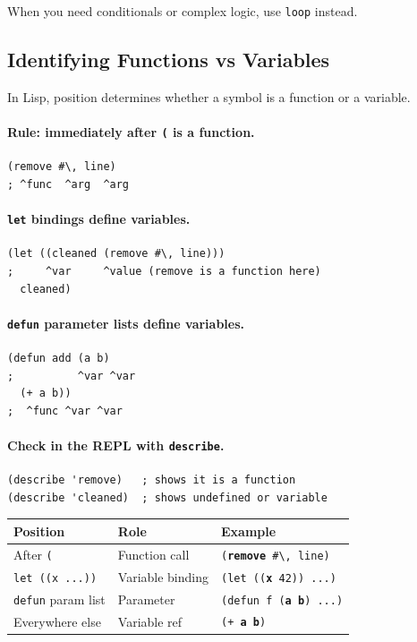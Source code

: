 When you need conditionals or complex logic, use \texttt{loop} instead.

\subsection{Identifying Functions vs Variables}

In Lisp, position determines whether a symbol is a function or a variable.

\paragraph{Rule: immediately after \texttt{(} is a function.}

\begin{lstlisting}
(remove #\, line)
; ^func  ^arg  ^arg
\end{lstlisting}

\paragraph{\texttt{let} bindings define variables.}

\begin{lstlisting}
(let ((cleaned (remove #\, line)))
;     ^var     ^value (remove is a function here)
  cleaned)
\end{lstlisting}

\paragraph{\texttt{defun} parameter lists define variables.}

\begin{lstlisting}
(defun add (a b)
;          ^var ^var
  (+ a b))
;  ^func ^var ^var
\end{lstlisting}

\paragraph{Check in the REPL with \texttt{describe}.}

\begin{lstlisting}
(describe 'remove)   ; shows it is a function
(describe 'cleaned)  ; shows undefined or variable
\end{lstlisting}

\begin{center}
\begin{tabular}{lll}
  \toprule
  \textbf{Position} & \textbf{Role} & \textbf{Example} \\
  \midrule
  After \texttt{(}            & Function call    & \texttt{(\textbf{remove} \#\textbackslash, line)} \\
  \texttt{let ((x ...))}      & Variable binding & \texttt{(let ((\textbf{x} 42)) ...)} \\
  \texttt{defun} param list   & Parameter        & \texttt{(defun f (\textbf{a} \textbf{b}) ...)} \\
  Everywhere else             & Variable ref     & \texttt{(+ \textbf{a} \textbf{b})} \\
  \bottomrule
\end{tabular}
\end{center}

